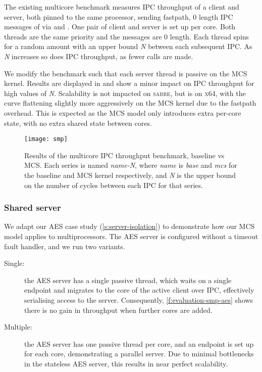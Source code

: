 The existing multicore benchmark measures IPC throughput of a client and server, both 
pinned to the same processor, sending fastpath, 0 length IPC messages of via \call
and \replyrecv. One pair of client and server is set up per core. Both threads are
the same priority and the messages are 0 length. Each thread spins for a random amount
with an upper bound \textit{N} between each subsequent IPC. As \textit{N} increases so does
IPC throughput, as fewer calls are made.

We modify the benchmark such that each server thread is passive on the MCS kernel.
Results are displayed in  and show a minor impact on IPC throughput
for high values of \textit{N}. Scalability is not impacted on \textsc{sabre}, but is on \textsc{x64},
with the curve flattening slightly more aggressively on the MCS kernel
due to the fastpath overhead. This is expected as the MCS model only introduces extra 
per-core state, with no extra shared state between cores.

\begin{figure}[ht] 
    \centering
    \texttt{[image: smp]}
    \caption[Results of the multicore IPC throughput benchmark.]{Results of the multicore IPC throughput benchmark, baseline \selfour vs MCS. 
        Each series is named \textit{name-N}, where \textit{name} is \textit{base} and \textit{mcs} for 
        the baseline and MCS kernel respectively, and \textit{N} is the upper
        bound on the number of cycles between each IPC for that series.}
    \label{f:evaluation-smp}
\end{figure}

\subsubsection{Shared server}

We adapt our \gls{AES} case study (\cref{s:server-isolation}) to demonstrate how our MCS model 
applies to multiprocessors. The AES server is configured without a timeout fault handler, and
we run two variants. 

\begin{description}
    \item[Single:] the AES server has a single passive thread, which waits on a single endpoint
        and migrates to the core of the active client over IPC, effectively serialising access to the server.
        Consequently, \cref{f:evaluation-smp-aes} shows there is no gain in throughput when further cores are
        added. 
    \item[Multiple:] the AES server has one passive thread per core, and an endpoint is set up for
        each core, demonstrating a parallel server. Due to minimal bottlenecks in the stateless 
        AES server, this results in near perfect scalability.
\end{description}


